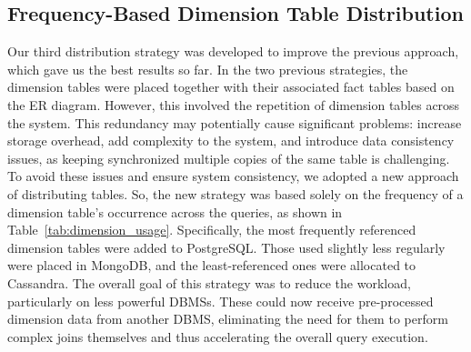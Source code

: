 \documentclass[conference]{IEEEtran}
\begin{document}
\subsection{Frequency-Based Dimension Table Distribution}

Our third distribution strategy was developed to improve the previous approach, which gave us the best results so far. In the two previous strategies, the dimension tables were placed together with their associated fact tables based on the ER diagram. However, this involved the repetition of dimension tables across the system. This redundancy may potentially cause significant problems: increase storage overhead, add complexity to the system, and introduce data consistency issues, as keeping synchronized multiple copies of the same table is challenging. To avoid these issues and ensure system consistency, we adopted a new approach of distributing tables. So, the new strategy was based solely on the frequency of a dimension table’s occurrence across the queries, as shown in Table~\ref{tab:dimension_usage}. Specifically, the most frequently referenced dimension tables were added to PostgreSQL. Those used slightly less regularly were placed in MongoDB, and the least-referenced ones were allocated to Cassandra. The overall goal of this strategy was to reduce the workload, particularly on less powerful DBMSs. These could now receive pre-processed dimension data from another DBMS, eliminating the need for them to perform complex joins themselves and thus accelerating the overall query execution.
\end{document}
